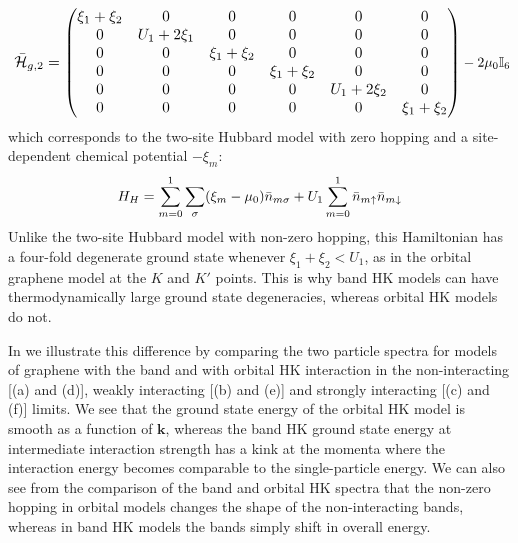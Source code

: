\documentclass[prb,aps,amssymb,twocolumn,notitlepage]{revtex4-2}
\begin{document}
\begin{equation}
\resizebox{0.95\linewidth}{!}{
$\Bar{\mathcal{H}}_{g,2}=\begin{pmatrix}
\xi_1+\xi_2&0&0&0&0&0\\
0&U_{1}+2\xi_1&0&0&0&0\\
0&0&\xi_1+\xi_2&0&0&0\\
0&0&0&\xi_1+\xi_2&0&0\\
0&0&0&0&U_1+2\xi_2&0\\
0&0&0&0&0&\xi_1+\xi_2
\end{pmatrix}$}-2\mu_{0}\mathbb{I}_{6}
\end{equation}
which corresponds to the two-site Hubbard model with zero hopping and a site-dependent chemical potential $-\xi_m$:
\begin{equation}
H_{H}=\sum^{1}_{m=0}\sum_{\sigma}(\xi_m-\mu_{0})\Bar{n}_{m\sigma}+U_{1}\sum^{1}_{m=0}\Bar{n}_{m\uparrow}\Bar{n}_{m\downarrow}
\end{equation}
Unlike the two-site Hubbard model with non-zero hopping, this Hamiltonian has a four-fold degenerate ground state whenever $\xi_{1}+\xi_{2}<U_{1}$, as in the orbital graphene model at the $K$ and $K'$ points.
This is why band HK models can have thermodynamically large ground state degeneracies, whereas orbital HK models do not.

In  we illustrate this difference by comparing the two particle spectra for models of graphene with the band and with orbital HK interaction in the non-interacting [(a) and (d)], weakly interacting [(b) and (e)] and strongly interacting [(c) and (f)] limits. 
We see that the ground state energy of the orbital HK model is smooth as a function of $\mathbf{k}$, whereas the band HK ground state energy at intermediate interaction strength has a kink at the momenta where the interaction energy becomes comparable to the single-particle energy. 
We can also see from the comparison of the band and orbital HK spectra that the non-zero hopping in orbital models changes the shape of the non-interacting bands, whereas in band HK models the bands simply shift in overall energy.
\end{document}
